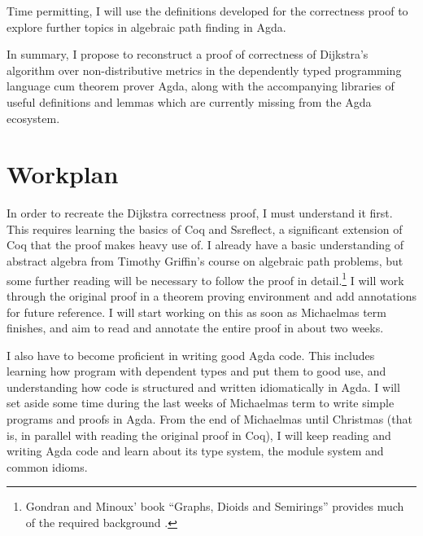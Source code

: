 \documentclass[a4paper]{scrartcl}
\begin{document}
Time permitting, I will use the definitions developed for the correctness proof to explore further topics in algebraic path finding in Agda.

In summary, I propose to reconstruct a proof of correctness of Dijkstra's algorithm over non-distributive metrics in the dependently typed programming language cum theorem prover Agda, along with the accompanying libraries of useful definitions and lemmas which are currently missing from the Agda ecosystem.


\section{Workplan%
  \label{workplan}%
}

In order to recreate the Dijkstra correctness proof, I must understand it first. This requires learning the basics of Coq and Ssreflect, a significant extension of Coq that the proof makes heavy use of. I already have a basic understanding of abstract algebra from Timothy Griffin's course on algebraic path problems, but some further reading will be necessary to follow the proof in detail.\footnote{Gondran and Minoux' book \enquote{Graphs, Dioids and Semirings} provides much of the required background \autocite{gondran_graphs_2008}.} I will work through the original proof in a theorem proving environment and add annotations for future reference. I will start working on this as soon as Michaelmas term finishes, and aim to read and annotate the entire proof in about two weeks.

I also have to become proficient in writing good Agda code. This includes learning how program with dependent types and put them to good use, and understanding how code is structured and written idiomatically in Agda. I will set aside some time during the last weeks of Michaelmas term to write simple programs and proofs in Agda. From the end of Michaelmas until Christmas (that is, in parallel with reading the original proof in Coq), I will keep reading and writing Agda code and learn about its type system, the module system and common idioms.

\end{document}
